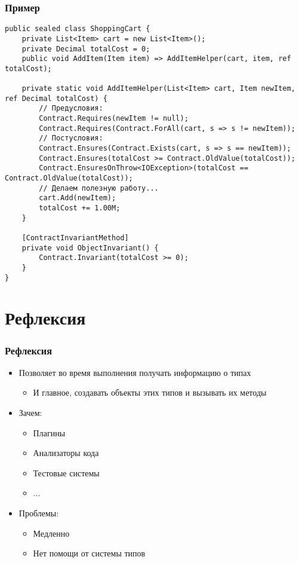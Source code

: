 \documentclass[xetex,mathserif,serif]{beamer}
\begin{document}
	\begin{frame}[fragile]
		\frametitle{Пример}
		\begin{scriptsize}
			\begin{verbatim}
public sealed class ShoppingCart {
    private List<Item> cart = new List<Item>();
    private Decimal totalCost = 0;
    public void AddItem(Item item) => AddItemHelper(cart, item, ref totalCost);

    private static void AddItemHelper(List<Item> cart, Item newItem, ref Decimal totalCost) {
        // Предусловия:
        Contract.Requires(newItem != null);
        Contract.Requires(Contract.ForAll(cart, s => s != newItem));
        // Постусловия:
        Contract.Ensures(Contract.Exists(cart, s => s == newItem));
        Contract.Ensures(totalCost >= Contract.OldValue(totalCost));
        Contract.EnsuresOnThrow<IOException>(totalCost == Contract.OldValue(totalCost));
        // Делаем полезную работу...
        cart.Add(newItem);
        totalCost += 1.00M;
    }

    [ContractInvariantMethod]
    private void ObjectInvariant() {
        Contract.Invariant(totalCost >= 0);
    }
}
			\end{verbatim}
		\end{scriptsize}
	\end{frame}

	\section{Рефлексия}

	\begin{frame}
		\frametitle{Рефлексия}
		\begin{itemize}
			\item Позволяет во время выполнения получать информацию о типах
			\begin{itemize}
				\item И главное, создавать объекты этих типов и вызывать их методы
			\end{itemize}
			\item Зачем:
			\begin{itemize}
				\item Плагины
				\item Анализаторы кода
				\item Тестовые системы
				\item ...
			\end{itemize}
			\item Проблемы:
			\begin{itemize}
				\item Медленно
				\item Нет помощи от системы типов
			\end{itemize}
		\end{itemize}
	\end{frame}
\end{document}

